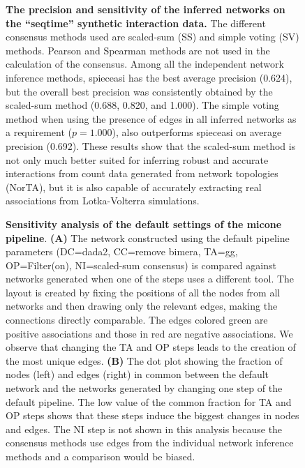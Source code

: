   \begin{figure}[H]
    \centering
      \caption{
        \textbf{The precision and sensitivity of the inferred networks on the ``seqtime'' synthetic interaction data.}
        The different consensus methods used are scaled-sum (SS) and simple voting (SV) methods.
        Pearson and Spearman methods are not used in the calculation of the consensus.
        Among all the independent network inference methods, \acs{spieceasi} has the best average precision (0.624), but the overall best precision was consistently obtained by the scaled-sum method (0.688, 0.820, and 1.000).
        The simple voting method when using the presence of edges in all inferred networks as a requirement ($p = 1.000$), also outperforms \acs{spieceasi} on average precision (0.692).
        These results show that the scaled-sum method is not only much better suited for inferring robust and accurate interactions from count data generated from network topologies (NorTA), but it is also capable of accurately extracting real associations from Lotka-Volterra simulations.
      }
    \label{fig:figure_s6}
  \end{figure}

  \begin{figure}[H]
    \centering
    \caption{
      \textbf{Sensitivity analysis of the default settings of the \ac{micone} pipeline}.
      \textbf{(A)} The network constructed using the default pipeline parameters (DC=\ac{dada2}, CC=remove bimera, TA=\ac{gg}, OP=Filter(on), NI=scaled-sum consensus) is compared against networks generated when one of the steps uses a different tool.
      The layout is created by fixing the positions of all the nodes from all networks and then drawing only the relevant edges, making the connections directly comparable.
      The edges colored green are positive associations and those in red are negative associations.
      We observe that changing the TA and OP steps leads to the creation of the most unique edges.
      \textbf{(B)} The dot plot showing the fraction of nodes (left) and edges (right) in common between the default network and the networks generated by changing one step of the default pipeline.
      The low value of the common fraction for TA and OP steps shows that these steps induce the biggest changes in nodes and edges.
      The NI step is not shown in this analysis because the consensus methods use edges from the individual network inference methods and a comparison would be biased.
    }
    \label{fig:figure_s7}
  \end{figure}

